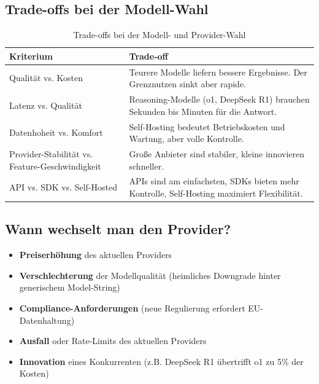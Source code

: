 \subsection{Trade-offs bei der Modell-Wahl}

\begin{table}[H]
\centering
\begin{tabularx}{\linewidth}{lX}
\toprule
\textbf{Kriterium} & \textbf{Trade-off} \\
\midrule
Qualität vs. Kosten & Teurere Modelle liefern bessere Ergebnisse. Der Grenznutzen sinkt aber rapide. \\
Latenz vs. Qualität & Reasoning-Modelle (o1, DeepSeek R1) brauchen Sekunden bis Minuten für die Antwort. \\
Datenhoheit vs. Komfort & Self-Hosting bedeutet Betriebskosten und Wartung, aber volle Kontrolle. \\
Provider-Stabilität vs. Feature-Geschwindigkeit & Große Anbieter sind stabiler, kleine innovieren schneller. \\
API vs. SDK vs. Self-Hosted & APIs sind am einfachsten, SDKs bieten mehr Kontrolle, Self-Hosting maximiert Flexibilität. \\
\bottomrule
\end{tabularx}
\caption{Trade-offs bei der Modell- und Provider-Wahl}
\label{tab:provider-tradeoffs}
\end{table}

\subsection{Wann wechselt man den Provider?}

\begin{itemize}[leftmargin=*]
    \item \textbf{Preiserhöhung} des aktuellen Providers
    \item \textbf{Verschlechterung} der Modellqualität (heimliches Downgrade hinter generischem Model-String)
    \item \textbf{Compliance-Anforderungen} (neue Regulierung erfordert EU-Datenhaltung)
    \item \textbf{Ausfall} oder Rate-Limits des aktuellen Providers
    \item \textbf{Innovation} eines Konkurrenten (z.B. DeepSeek R1 übertrifft o1 zu 5\% der Kosten)
\end{itemize}

